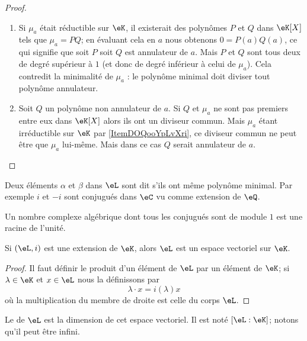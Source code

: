\begin{proof}
    \begin{enumerate}
        \item
            Si \( \mu_a\) était réductible sur \( \eK\), il existerait des polynômes \( P\) et \( Q\) dans \( \eK[X]\) tels que \( \mu_a=PQ\); en évaluant cela en \( a\) nous obtenons \( 0=P(a)Q(a)\), ce qui signifie que soit \( P\) soit \( Q\) est annulateur de \( a\). Mais \( P\) et \( Q\) sont tous deux de degré supérieur à \( 1\) (et donc de degré inférieur à celui de \( \mu_a\)). Cela contredit la minimalité de \( \mu_a\) : le polynôme minimal doit diviser tout polynôme annulateur.
        \item
            Soit \( Q\) un polynôme non annulateur de \( a\). Si \( Q\) et \( \mu_a\) ne sont pas premiers entre eux dans \( \eK[X]\) alors ils ont un diviseur commun. Mais \( \mu_a\) étant irréductible sur \( \eK\) par \ref{ItemDOQooYpLvXri}, ce diviseur commun ne peut être que \( \mu_a\) lui-même. Mais dans ce cas \( Q\) serait annulateur de \( a\).
    \end{enumerate}
\end{proof}

Deux éléments \( \alpha\) et \( \beta\) dans \( \eL\) sont dit  s'ils ont même polynôme minimal. Par exemple \( i\) et \( -i\) sont conjugués dans \( \eC\) vu comme extension de \( \eQ\).

\begin{lemma}
    Un nombre complexe algébrique dont tous les conjugués sont de module \( 1\) est une racine de l'unité.
\end{lemma}

\begin{lemma}       \label{LemooOLIIooXzdppM}
    Si \( (\eL,i)\) est une extension de \( \eK\), alors \( \eL\) est un espace vectoriel sur \( \eK\).
\end{lemma}

\begin{proof}
    Il faut définir le produit d'un élément de \( \eL\) par un élément de \( \eK\); si \( \lambda\in \eK\) et \( x\in \eL\) nous la définissons par
    \begin{equation}
        \lambda\cdot x=i(\lambda)x
    \end{equation}
    où la multiplication du membre de droite est celle du corps \( \eL\). 
\end{proof}

\begin{definition}      \label{DefUYiyieu}
    Le  de \( \eL\) est la dimension de cet espace vectoriel. Il est noté \( [\eL:\eK]\); notons qu'il peut être infini.
\end{definition}

